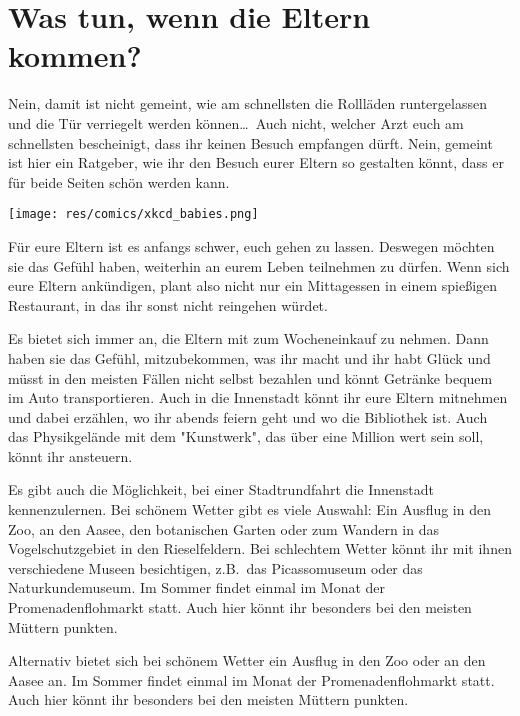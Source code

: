 
\section{Was tun, wenn die Eltern kommen?}
\begin{multicols}{2}
Nein, damit ist nicht gemeint, wie am schnellsten die Rollläden runtergelassen und die Tür verriegelt werden können\dots\ Auch nicht, welcher Arzt euch am schnellsten bescheinigt, dass ihr keinen Besuch empfangen dürft. Nein, gemeint ist hier ein Ratgeber, wie ihr den Besuch eurer Eltern so gestalten könnt, dass er für beide Seiten schön werden kann.

\begin{center}
\texttt{[image: res/comics/xkcd\_babies.png]}
\end{center}

Für eure Eltern ist es anfangs schwer, euch gehen zu lassen. Deswegen möchten sie das Gefühl haben, weiterhin an eurem Leben teilnehmen zu dürfen. Wenn sich eure Eltern ankündigen, plant also nicht nur ein Mittagessen in einem spießigen Restaurant, in das ihr sonst nicht reingehen würdet.

Es bietet sich immer an, die Eltern mit zum Wocheneinkauf zu nehmen. Dann haben sie das Gefühl, mitzubekommen, was ihr macht und ihr habt Glück und müsst in den meisten Fällen nicht selbst bezahlen und könnt Getränke bequem im Auto transportieren. Auch in die Innenstadt könnt ihr eure Eltern mitnehmen und dabei erzählen, wo ihr abends feiern geht und wo die Bibliothek ist. Auch das Physikgelände mit dem "Kunstwerk", das über eine Million wert sein soll, könnt ihr ansteuern.

Es gibt auch die Möglichkeit, bei einer Stadtrundfahrt die Innenstadt kennenzulernen. Bei schönem Wetter gibt es viele Auswahl: Ein Ausflug in den Zoo, an den Aasee, den botanischen Garten oder zum Wandern in das Vogelschutzgebiet in den Rieselfeldern. Bei schlechtem Wetter könnt ihr mit ihnen verschiedene Museen besichtigen, z.B.\ das Picassomuseum oder das Naturkundemuseum. Im Sommer findet einmal im Monat der Promenadenflohmarkt statt. Auch hier könnt ihr besonders bei den meisten Müttern punkten.

Alternativ bietet sich bei schönem Wetter ein Ausflug in den Zoo oder an den Aasee an. Im Sommer findet einmal im Monat der Promenadenflohmarkt statt. Auch hier könnt ihr besonders bei den meisten Müttern punkten.


\end{multicols}
